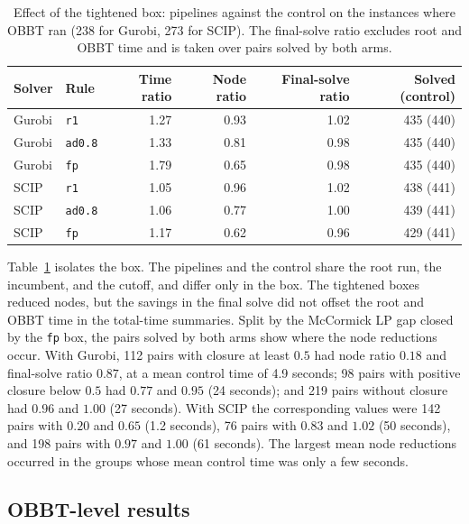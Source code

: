 \begin{table}[htbp]
\centering
\small
\begin{tabular}{@{}llrrrr@{}}
\toprule
Solver & Rule & Time ratio & Node ratio & Final-solve ratio & Solved (control)\\
\midrule
Gurobi & \texttt{r1} & 1.27 & 0.93 & 1.02 & 435 (440)\\
Gurobi & \texttt{ad0.8} & 1.33 & 0.81 & 0.98 & 435 (440)\\
Gurobi & \texttt{fp} & 1.79 & 0.65 & 0.98 & 435 (440)\\
SCIP & \texttt{r1} & 1.05 & 0.96 & 1.02 & 438 (441)\\
SCIP & \texttt{ad0.8} & 1.06 & 0.77 & 1.00 & 439 (441)\\
SCIP & \texttt{fp} & 1.17 & 0.62 & 0.96 & 429 (441)\\
\bottomrule
\end{tabular}
\caption{Effect of the tightened box: pipelines against the control on the
instances where OBBT ran (238 for Gurobi, 273 for SCIP). The final-solve ratio
excludes root and OBBT time and is taken over pairs solved by both arms.}
\label{tab:precursor-control}
\end{table}

Table~\ref{tab:precursor-control} isolates the box. The pipelines and the
control share the root run, the incumbent, and the cutoff, and differ only in the
box. The tightened boxes reduced nodes, but the savings in the final solve did
not offset the root and OBBT time in the total-time summaries. Split by the
McCormick LP gap closed by the \texttt{fp} box, the pairs solved by both arms
show where the node reductions occur. With Gurobi, 112 pairs with closure at
least $0.5$ had node ratio $0.18$ and final-solve ratio $0.87$, at a mean control time of 4.9 seconds; 98 pairs with
positive closure below $0.5$ had $0.77$ and $0.95$ (24 seconds); and 219 pairs
without closure had $0.96$ and $1.00$ (27 seconds). With SCIP the corresponding
values were 142 pairs with $0.20$ and $0.65$ (1.2 seconds), 76 pairs with $0.83$
and $1.02$ (50 seconds), and 198 pairs with $0.97$ and $1.00$ (61 seconds). The
largest mean node reductions occurred in the groups whose mean control time was
only a few seconds.

\subsection{OBBT-level results}

